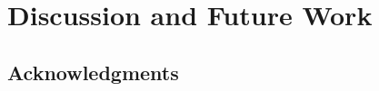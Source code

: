 \documentclass{article}
\begin{document}
\vskip -0.15in %
\section{Discussion and Future Work} %
\vskip -0.10in %


\vskip -0.15in %
\subsection*{Acknowledgments}
\vskip -0.10in %



\small
\newpage


%
\end{document}
